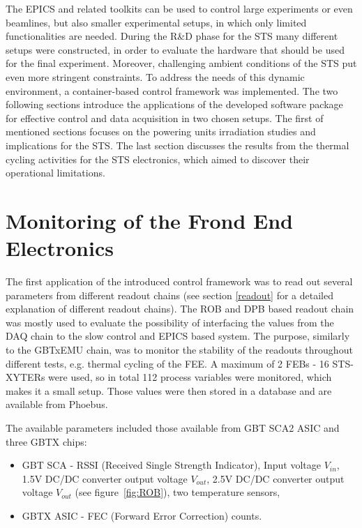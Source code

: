 The \gls{EPICS} and related toolkits can be used to control large experiments or even beamlines, but also smaller experimental setups, in which only limited functionalities are needed. During the R\&D phase for the \gls{STS} many different setups were constructed, in order to evaluate the hardware that should be used for the final experiment. Moreover, challenging ambient conditions of the \gls{STS} put even more stringent constraints. To address the needs of this dynamic environment, a container-based control framework was implemented. 
The two following sections introduce the applications of the developed software package for effective control and data acquisition in two chosen setups. The first of mentioned sections focuses on the powering units irradiation studies and implications for the \gls{STS}. The last section discusses the results from the thermal cycling activities for the \gls{STS} electronics, which aimed to discover their operational limitations. 

\section{Monitoring of the Frond End Electronics}
The first application of the introduced control framework was to read out several parameters from different readout chains (see section \ref{readout} for a detailed explanation of different readout chains). The \gls{ROB} and \gls{DPB} based readout chain was mostly used to evaluate the possibility of interfacing the values from the \gls{DAQ} chain to the slow control and \gls{EPICS} based system. The purpose, similarly to the GBTxEMU chain, was to monitor the stability of the readouts throughout different tests, e.g. thermal cycling of the \gls{FEE}. A maximum of 2 \glspl{FEB} - 16 STS-XYTERs were used, so in total 112 process variables were monitored, which makes it a small setup. Those values were then stored in a database and are available from Phoebus. 

The available parameters included those available from \gls{GBT} \gls{SCA2} \gls{ASIC} \cite{GBT_SCA_ASIC} and three GBTX chips: 
\begin{itemize}
    \item GBT SCA - RSSI (Received Single Strength Indicator), Input voltage $V_{in}$, 1.5V DC/DC converter output voltage $V_{out}$, 2.5V DC/DC converter output voltage $V_{out}$ (see figure~\ref{fig:ROB}), two temperature sensors,
    \item GBTX \gls{ASIC} - FEC (Forward Error Correction) counts.
\end{itemize}

